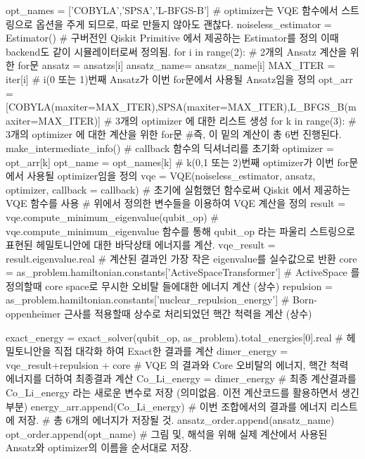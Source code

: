 \documentclass[11pt]{article}
\begin{document}
\begin{CodeBox}[title={Example: Python snippet}]
    opt_names = ['COBYLA','SPSA','L-BFGS-B'] 
    # optimizer는 VQE 함수에서 스트링으로 옵션을 주게 되므로, 따로 만들지 않아도 괜찮다. 
    noiseless_estimator = Estimator()
    # 구버전인 Qiskit Primitive 에서 제공하는 Estimator를 정의 이때 backend도 같이 시뮬레이터로써 정의됨. 
    for i in range(2): # 2개의 Ansatz 계산을 위한 for문
        ansatz = ansatzs[i]
        ansatz_name= ansatzs_name[i]
        MAX_ITER = iter[i]
        # i(0 또는 1)번째 Ansatz가 이번 for문에서 사용될 Ansatz임을 정의 
        opt_arr = [COBYLA(maxiter=MAX_ITER),SPSA(maxiter=MAX_ITER),L_BFGS_B(maxiter=MAX_ITER)]
        # 3개의 optimizer 에 대한 리스트 생성
        for k in range(3): # 3개의 optimizer 에 대한 계산을 위한 for문
        #즉, 이 밑의 계산이 총 6번 진행된다.
            make_intermediate_info()
            # callback 함수의 딕셔너리를 초기화
            optimizer = opt_arr[k]
            opt_name = opt_names[k]
            # k(0,1 또는 2)번째 optimizer가 이번 for문에서 사용될 optimizer임을 정의 
            vqe = VQE(noiseless_estimator, ansatz, optimizer, callback = callback)
            # 초기에 실험했던 함수로써 Qiskit 에서 제공하는 VQE 함수를 사용 
            # 위에서 정의한 변수들을 이용하여 VQE 계산을 정의
            result = vqe.compute_minimum_eigenvalue(qubit_op)
            # vqe.compute_minimum_eigenvalue 함수를 통해 qubit_op 라는 파울리 스트링으로 표현된 헤밀토니안에 대한 바닥상태 에너지를 계산.
            vqe_result = result.eigenvalue.real
            # 계산된 결과인 가장 작은 eigenvalue를 실수값으로 반환
            core = as_problem.hamiltonian.constants['ActiveSpaceTransformer']
            # ActiveSpace 를 정의할때 core space로 무시한 오비탈 들에대한 에너지 계산 (상수)
            repulsion = as_problem.hamiltonian.constants['nuclear_repulsion_energy']
            # Born-oppenheimer 근사를 적용할때 상수로 처리되었던 핵간 척력을 계산 (상수)
            
            exact_energy = exact_solver(qubit_op, as_problem).total_energies[0].real
            # 헤밀토니안을 직접 대각화 하여 Exact한 결과를 계산
            dimer_energy = vqe_result+repulsion + core
            # VQE 의 결과와 Core 오비탈의 에너지, 핵간 척력 에너지를 더하여 최종결과 계산
            Co_Li_energy = dimer_energy
            # 최종 계산결과를 Co_Li_energy 라는 새로운 변수로 저장 (의미없음. 이전 계산코드를 활용하면서 생긴 부분)
            energy_arr.append(Co_Li_energy)
            # 이번 조합에서의 결과를 에너지 리스트에 저장. 
            # 총 6개의 에너지가 저장될 것. 
            ansatz_order.append(ansatz_name)
            opt_order.append(opt_name)
            # 그림 및, 해석을 위해 실제 계산에서 사용된 Ansatz와 optimizer의 이름을 순서대로 저장. 
            

\end{CodeBox}
\end{document}
